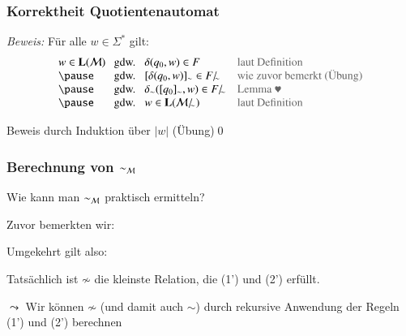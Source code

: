 \documentclass[aspectratio=1610,onlymath]{beamer}
\begin{document}
\begin{frame}\frametitle{Korrektheit Quotientenautomat}


\emph{Beweis:}
Für alle $w\in\Sigma^*$ gilt:
\[\begin{array}{l@{~~\text{ gdw. }~~}ll}
 w\in \Slang{L}(\Smach{M})
	& \delta(q_0,w)\in F & \textcolor{devilscss}{\text{laut Definition}}\\\pause
	& [\delta(q_0,w)]_\sim\in \simquot{F} & \textcolor{devilscss}{\text{wie zuvor bemerkt (Übung)}} \\\pause
	& \delta_\sim([q_0]_\sim,w)\in \simquot{F} & \textcolor{devilscss}{\text{Lemma $\varheartsuit$}}\\\pause
	& w\in \Slang{L}(\simquot{\Smach{M}}) & \textcolor{devilscss}{\text{laut Definition}}
\end{array}
\]\pause


Beweis durch Induktion über $|w|$ (Übung)\qed

\end{frame}


\begin{frame}\frametitle{Berechnung von $\sim_{\mathcal{M}}$}

\alert{Wie kann man $\sim_{\mathcal{M}}$ praktisch ermitteln?}
\bigskip 

Zuvor bemerkten wir:
%
\bigskip 

Umgekehrt gilt also:
%
\bigskip 

Tatsächlich ist $\not\sim$ die \alert{kleinste Relation}, die (1') und (2') erfüllt.
\medskip

$\leadsto$ Wir können $\not\sim$ (und damit auch $\sim$) durch rekursive Anwendung der Regeln (1') und (2') berechnen


\end{frame}
\end{document}
